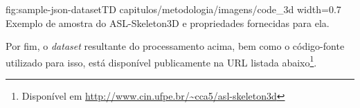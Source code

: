 \figura
    {fig:sample-json-datasetTD} %
    {capitulos/metodologia/imagens/code_3d} %
    {width=0.7\linewidth} %
    {Exemplo de amostra do ASL-Skeleton3D e propriedades fornecidas para ela.} %
    {} %

Por fim, o \textit{dataset} resultante do processamento acima, bem como o código-fonte utilizado para isso, está disponível publicamente na URL listada abaixo\footnote{Disponível em \url{http://www.cin.ufpe.br/~cca5/asl-skeleton3d}}.
